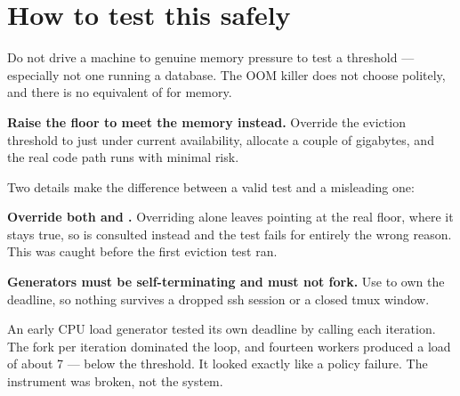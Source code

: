 \section{How to test this safely}

\begin{trap}
Do not drive a machine to genuine memory pressure to test a threshold ---
especially not one running a database. The OOM killer does not choose politely,
and there is no equivalent of  for memory.
\end{trap}

\textbf{Raise the floor to meet the memory instead.} Override the eviction
threshold to just under current availability, allocate a couple of gigabytes, and
the real code path runs with minimal risk.

Two details make the difference between a valid test and a misleading one:

\textbf{Override both  and .} Overriding
 alone leaves  pointing at the real floor, where it
stays true, so  is consulted instead and the test fails for entirely
the wrong reason. This was caught before the first eviction test ran.

\textbf{Generators must be self-terminating and must not fork.} Use 
to own the deadline, so nothing survives a dropped ssh session or a closed tmux
window.

\begin{trap}
An early CPU load generator tested its own deadline by calling 
each iteration. The fork per iteration dominated the loop, and fourteen workers
produced a load of about 7 --- below the threshold. It looked exactly like a
policy failure. The instrument was broken, not the system.
\end{trap}

